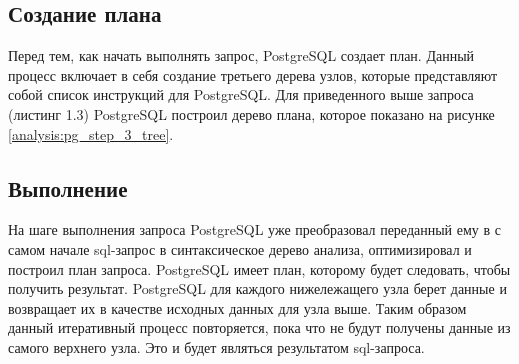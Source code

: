 \subsection{Создание плана}

Перед тем, как начать выполнять запрос, PostgreSQL создает план.
Данный процесс включает в себя создание третьего дерева узлов, 
которые представляют собой список инструкций для PostgreSQL.
Для приведенного выше запроса (листинг 1.3) PostgreSQL построил 
дерево плана, которое показано на рисунке \ref{analysis:pg_step_3_tree}.

\begin{figure}[ht!]
\end{figure}

\newpage

\subsection{Выполнение}

На шаге выполнения запроса PostgreSQL уже преобразовал переданный ему в с самом начале 
sql-запрос в синтаксическое дерево анализа, оптимизировал и построил план запроса.
PostgreSQL имеет план, которому будет следовать, чтобы получить результат.
PostgreSQL для каждого нижележащего узла берет данные и возвращает их 
в качестве исходных данных для узла выше. 
Таким образом данный итеративный процесс повторяется,
пока что не будут получены данные из самого верхнего узла.
Это и будет являться результатом sql-запроса.



